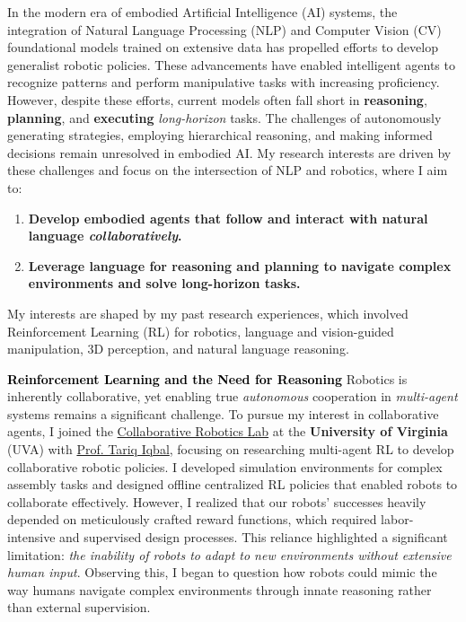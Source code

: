 \documentclass[10pt]{article}
\newcommand{\statement}[1]{\medskip\noindent
  \textcolor{black}{\textbf{#1}}\space
}
\begin{document}
\noindent In the modern era of embodied Artificial Intelligence (AI) systems, the integration of Natural Language Processing (NLP) and Computer Vision (CV) foundational models trained on extensive data has propelled efforts to develop generalist robotic policies. These advancements have enabled intelligent agents to recognize patterns and perform manipulative tasks with increasing proficiency. However, despite these efforts, current models often fall short in \textbf{reasoning}, \textbf{planning}, and \textbf{executing} \textit{long-horizon} tasks. The challenges of autonomously generating strategies, employing hierarchical reasoning, and making informed decisions remain unresolved in embodied AI. My research interests are driven by these challenges and focus on the intersection of NLP and robotics, where I aim to:
\begin{enumerate}[label=(\arabic*), itemindent=0pt, itemsep=0pt, parsep=0pt, nosep]
    \item \textbf{Develop embodied agents that follow and interact with natural language \textit{collaboratively}.}
    \item \textbf{Leverage language for reasoning and planning to navigate complex environments and solve long-horizon tasks.}
\end{enumerate}
My interests are shaped by my past research experiences, which involved Reinforcement Learning (RL) for robotics, language and vision-guided manipulation, 3D perception, and natural language reasoning.

\statement{Reinforcement Learning and the Need for Reasoning} Robotics is inherently collaborative, yet enabling true \textit{autonomous} cooperation in \textit{multi-agent} systems remains a significant challenge. To pursue my interest in collaborative agents, I joined the \href{https://www.collabrobotics.com/}{Collaborative Robotics Lab} at the \textbf{University of Virginia} (UVA) with  \href{https://www.tiqbal.com/}{Prof. Tariq Iqbal}, focusing on researching multi-agent RL to develop collaborative robotic policies. I developed simulation environments for complex assembly tasks and designed offline centralized RL policies that enabled robots to collaborate effectively. However, I realized that our robots' successes heavily depended on meticulously crafted reward functions, which required labor-intensive and supervised design processes. This reliance highlighted a significant limitation: \textit{the inability of robots to adapt to new environments without extensive human input}. Observing this, I began to question how robots could mimic the way humans navigate complex environments through innate reasoning rather than external supervision.
\end{document}
